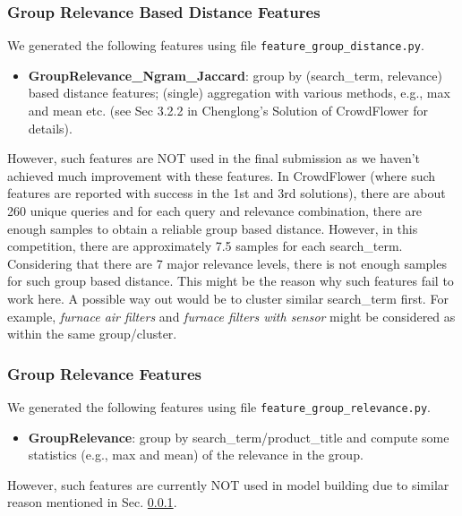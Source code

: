 \documentclass[12pt]{article}
\begin{document}
{{\subsubsection{Group Relevance Based Distance Features}
\label{subsubsec:Feature_Chenglong_Group_Dist}
We generated the following features using file \texttt{feature\_group\_distance.py}.
\begin{itemize}
\item \textbf{GroupRelevance\_Ngram\_Jaccard}: group by (search\_term, relevance) based distance features; (single) aggregation with various methods, e.g., max and mean etc. (see Sec 3.2.2 in Chenglong's Solution of CrowdFlower for details).
\end{itemize}
However, such features are NOT used in the final submission as we haven't achieved much improvement with these features. In CrowdFlower (where such features are reported with success in the 1st and 3rd solutions), there are about 260 unique queries and for each query and relevance combination, there are enough samples to obtain a reliable group based distance. However, in this competition, there are approximately 7.5 samples for each search\_term. Considering that there are 7 major relevance levels, there is not enough samples for such group based distance. This might be the reason why such features fail to work here. A possible way out would be to cluster similar search\_term first. For example, \emph{furnace air filters} and \emph{furnace filters with sensor} might be considered as within the same group/cluster.

\subsubsection{Group Relevance Features}
We generated the following features using file \texttt{feature\_group\_relevance.py}.
\begin{itemize}
\item \textbf{GroupRelevance}: group by search\_term/product\_title and compute some statistics (e.g., max and mean) of the relevance in the group.
\end{itemize}
However, such features are currently NOT used in model building due to similar reason mentioned in Sec. \ref{subsubsec:Feature_Chenglong_Group_Dist}.

}}
\end{document}
